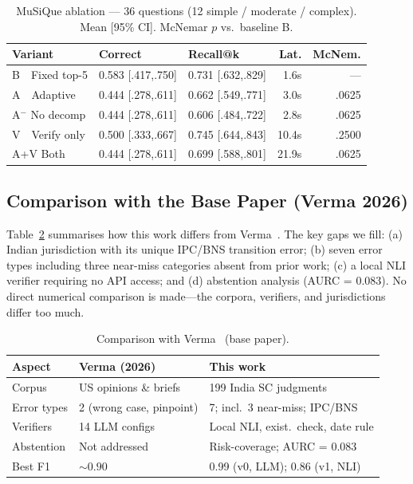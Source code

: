 \documentclass[conference]{IEEEtran}
\begin{document}
\begin{table}[t]
\centering
\caption{MuSiQue ablation --- 36 questions (12 simple / moderate / complex).
         Mean [95\% CI]. McNemar $p$ vs.\ baseline B.}
\label{tab:musique}
\renewcommand{\arraystretch}{1.15}
\footnotesize
\begin{tabular}{@{}lp{1.9cm}p{1.9cm}rr@{}}
\toprule
\textbf{Variant} & \textbf{Correct} & \textbf{Recall@k} & \textbf{Lat.} & \textbf{McNem.} \\
\midrule
B~~Fixed top-5   & 0.583 [.417,.750] & 0.731 [.632,.829] & 1.6s  & ---  \\
A~~Adaptive      & 0.444 [.278,.611] & 0.662 [.549,.771] & 3.0s  & .0625\\
A$^-$ No decomp  & 0.444 [.278,.611] & 0.606 [.484,.722] & 2.8s  & .0625\\
V~~Verify only   & 0.500 [.333,.667] & 0.745 [.644,.843] & 10.4s & .2500\\
A+V Both         & 0.444 [.278,.611] & 0.699 [.588,.801] & 21.9s & .0625\\
\bottomrule
\end{tabular}
\end{table}

\subsection{Comparison with the Base Paper (Verma 2026)}

Table~\ref{tab:comparison} summarises how this work differs from Verma~\cite{verma2026citation}.
The key gaps we fill: (a) Indian jurisdiction with its unique IPC/BNS transition error; (b) seven
error types including three near-miss categories absent from prior work; (c) a local NLI verifier
requiring no API access; and (d) abstention analysis (AURC = 0.083). No direct numerical
comparison is made---the corpora, verifiers, and jurisdictions differ too much.

\begin{table}[t]
\centering
\caption{Comparison with Verma~\cite{verma2026citation} (base paper).}
\label{tab:comparison}
\renewcommand{\arraystretch}{1.1}
\footnotesize
\begin{tabular}{@{}p{1.3cm}p{2.7cm}p{2.7cm}@{}}
\toprule
\textbf{Aspect} & \textbf{Verma (2026)} & \textbf{This work} \\
\midrule
Corpus       & US opinions \& briefs     & 199 India SC judgments \\
Error types  & 2 (wrong case, pinpoint)  & 7; incl.\ 3 near-miss; IPC/BNS \\
Verifiers    & 14 LLM configs            & Local NLI, exist.\ check, date rule \\
Abstention   & Not addressed             & Risk-coverage; AURC = 0.083 \\
Best F1      & ${\sim}0.90$              & 0.99 (v0, LLM); 0.86 (v1, NLI) \\
\bottomrule
\end{tabular}
\end{table}
\end{document}
